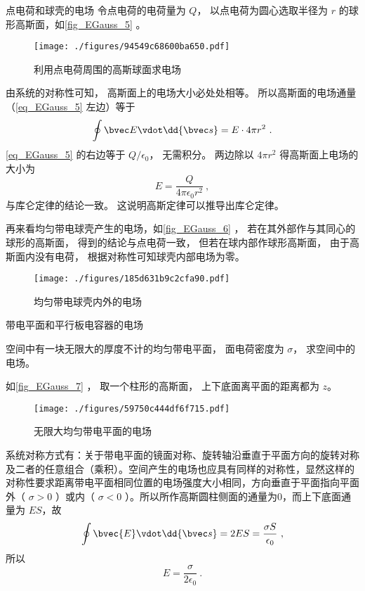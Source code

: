\begin{example}{点电荷和球壳的电场}\label{ex_EGauss_10}
令点电荷的电荷量为 $Q$， 以点电荷为圆心选取半径为 $r$ 的球形高斯面，如\autoref{fig_EGauss_5} 。 
\begin{figure}[ht]
\centering
\texttt{[image: ./figures/94549c68600ba650.pdf]}
\caption{利用点电荷周围的高斯球面求电场} \label{fig_EGauss_5}
\end{figure}
由系统的对称性可知， 高斯面上的电场大小必处处相等。 所以高斯面的电场通量（\autoref{eq_EGauss_5} 左边）等于
\begin{equation}
\oint \bvec E \vdot \dd{\bvec s} = E \cdot 4\pi r^2~.
\end{equation}
\autoref{eq_EGauss_5} 的右边等于 $Q/\epsilon_0$， 无需积分。 两边除以 $4\pi r^2$ 得高斯面上电场的大小为
\begin{equation}
E = \frac{Q}{4\pi\epsilon_0 r^2}~,
\end{equation}
与库仑定律的结论一致。 这说明高斯定律可以推导出库仑定律。

再来看均匀带电球壳产生的电场，如\autoref{fig_EGauss_6} ， 若在其外部作与其同心的球形的高斯面， 得到的结论与点电荷一致， 但若在球内部作球形高斯面， 由于高斯面内没有电荷， 根据对称性可知球壳内部电场为零。
\begin{figure}[ht]
\centering
\texttt{[image: ./figures/185d631b9c2cfa90.pdf]}
\caption{均匀带电球壳内外的电场} \label{fig_EGauss_6}
\end{figure}
\end{example}


\begin{example}{带电平面和平行板电容器的电场}

空间中有一块无限大的厚度不计的均匀带电平面， 面电荷密度为 $\sigma$， 求空间中的电场。

如\autoref{fig_EGauss_7} ， 取一个柱形的高斯面， 上下底面离平面的距离都为 $z$。
\begin{figure}[ht]
\centering
\texttt{[image: ./figures/59750c444df6f715.pdf]}
\caption{无限大均匀带电平面的电场} \label{fig_EGauss_7}
\end{figure}
系统对称方式有：关于带电平面的镜面对称、旋转轴沿垂直于平面方向的旋转对称及二者的任意组合（乘积）。空间产生的电场也应具有同样的对称性，显然这样的对称性要求距离带电平面相同位置的电场强度大小相同，方向垂直于平面指向平面外（ $\sigma>0$ ）或内（ $\sigma<0$ ）。所以所作高斯圆柱侧面的通量为0，而上下底面通量为 $ES$，故
\begin{equation}
\oint \bvec{E}\vdot \dd{\bvec s}=2ES=\frac{\sigma S}{\epsilon_0}~,
\end{equation}
所以
\begin{equation}
E=\frac{\sigma}{2\epsilon_0}~.
\end{equation}

\end{example}

